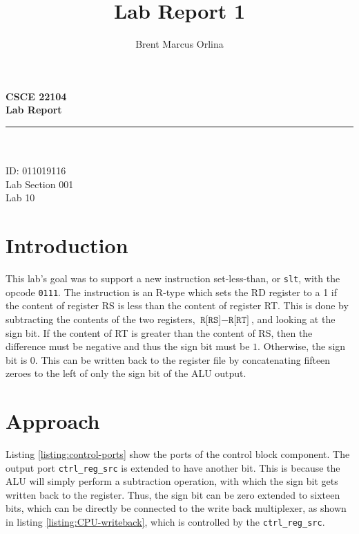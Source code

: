 \documentclass[11pt]{report}
\makeatletter
\newcommand{\@labsection}{000}
\newcommand{\labsection}[1]{
    \renewcommand{\@labsection}{#1}
}
\newcommand{\@labnumber}{0}
\newcommand{\labnumber}[1]{
    \renewcommand{\@labnumber}{#1}
}
\newcommand{\@shortsubmitted}{1/1/70}
\newcommand{\shortsubmitted}[1]{
    \renewcommand{\@shortsubmitted}{#1}
}
\renewcommand{\maketitle}{
    \newgeometry{left=1in, right=1in, top=1.75in, textheight=8.25in}
    \singlespacing
    \begin{center}
        {\huge \bf CSCE 22104} \\
        \vspace{2.5em}
        {\Large \bf Lab Report} \\
        \vspace{2em}
        \noindent\rule{20em}{0.4pt} \\
        \vspace{1em}
        {\Large \@author} \\
        \vspace{.75em}
        {\normalsize ID: 011019116} \\
        \vspace{.75em}
        {\normalsize Lab Section \@labsection} \\
        \vspace{.75em}
        {\normalsize Lab \@labnumber} \\
    \end{center}
    \newpage
    \restoregeometry
}
\makeatother
\begin{document}
\title{Lab Report 1}
\author{Brent Marcus Orlina}

\labsection{001}
\labnumber{10}

\shortsubmitted{4/23/25}

\maketitle

\section*{Introduction}
This lab's goal was to support a new instruction set-less-than, or \verb|slt|, with the opcode
\verb|0111|. The instruction is an R-type which sets the RD register to a 1 if the content of
register RS is less than the content of register RT. This is done by subtracting the contents of the
two registers, $\texttt{R[RS]} - \texttt{R[RT]}$, and looking at the sign bit. If the content of RT
is greater than the content of RS, then the difference must be negative and thus the sign bit must
be $1$. Otherwise, the sign bit is $0$. This can be written back to the register file by
concatenating fifteen zeroes to the left of only the sign bit of the ALU output.

\section*{Approach}

Listing \ref{listing:control-ports} show the ports of the control block component. The output port
\verb|ctrl_reg_src| is extended to have another bit. This is because the ALU will simply perform a
subtraction operation, with which the sign bit gets written back to the register. Thus, the sign bit
can be zero extended to sixteen bits, which can be directly be connected to the write back
multiplexer, as shown in listing \ref{listing:CPU-writeback}, which is controlled by the
\verb|ctrl_reg_src|.

\newpage

\end{document}
